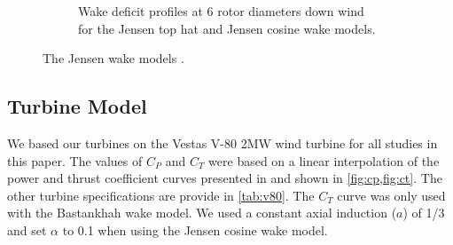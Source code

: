 \documentclass{jpconf}
\begin{document}
\begin{figure}[h!]
\begin{subfigure}[t]{0.35\textwidth}
		\caption{Wake deficit profiles at 6 rotor diameters down wind for the Jensen top hat and Jensen cosine wake models.}
		\label{fig:JensenProfiles}
	\end{subfigure}
	\caption{The Jensen wake models \cite{jensen1983}.}
\end{figure}

\subsection{Turbine Model}
We based our turbines on the Vestas V-80 2MW wind turbine for all studies in this paper. The values of $C_P$ and $C_T$ were based on a linear interpolation of the power and thrust coefficient curves presented in \cite{niayifar2016} and shown in \cref{fig:cp,fig:ct}. The other turbine specifications are provide in \cref{tab:v80}. The $C_T$ curve was only used with the Bastankhah wake model. We used a constant axial induction ($a$) of 1/3 and set $\alpha$ to 0.1 when using the Jensen cosine wake model.
%
\end{document}
